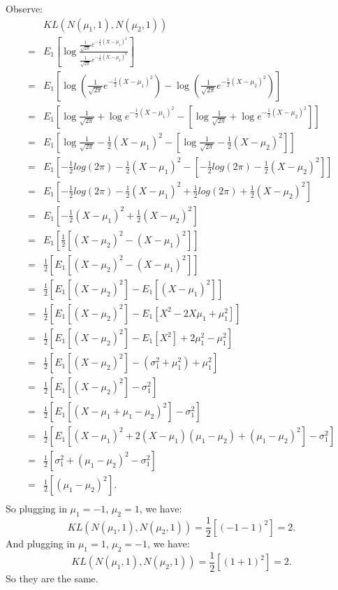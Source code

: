 \documentclass[12pt,oneside,reqno]{amsart}
\theoremstyle{plain}
\theoremstyle{definition}
\theoremstyle{remark}
\newcommand{\bb}{\vspace{3mm}}
\newcommand{\bee}{\begin{equation}\begin{aligned}}
\newcommand{\eee}{\end{aligned}\end{equation}}
\newcommand{\fracc}{\frac}
\begin{document}
\begin{enumerate}[label=\arabic*.]
\begin{enumerate}
Observe:
\bee
&KL(N(\mu_1,1),N(\mu_2,1))\\
 =& E_1\left[\log\fracc{\fracc{1}{\sqrt{2\pi}}e^{-\fracc{1}{2}(X - \mu_1)^2}}{\fracc{1}{\sqrt{2\pi}}e^{-\fracc{1}{2}(X - \mu_2)^2}} \right]\\
=& E_1\left[\log\left(\fracc{1}{\sqrt{2\pi}}e^{-\fracc{1}{2}(X - \mu_1)^2}\right) - \log\left(\fracc{1}{\sqrt{2\pi}}e^{-\fracc{1}{2}(X - \mu_2)^2}\right) \right]\\
=& E_1\left[\log\fracc{1}{\sqrt{2\pi}} + \log e^{-\fracc{1}{2}(X - \mu_1)^2} - \left[\log\fracc{1}{\sqrt{2\pi}} + \log e^{-\fracc{1}{2}(X - \mu_2)^2}\right] \right]\\
=& E_1\left[\log\fracc{1}{\sqrt{2\pi}}  -\fracc{1}{2}(X - \mu_1)^2 - \left[\log\fracc{1}{\sqrt{2\pi}}  -\fracc{1}{2}(X - \mu_2)^2\right] \right]\\
=& E_1\left[-\fracc{1}{2}log(2\pi)  -\fracc{1}{2}(X - \mu_1)^2 - \left[-\fracc{1}{2}log(2\pi)  -\fracc{1}{2}(X - \mu_2)^2\right] \right]\\
=& E_1\left[-\fracc{1}{2}log(2\pi)  -\fracc{1}{2}(X - \mu_1)^2 +\fracc{1}{2}log(2\pi)  +\fracc{1}{2}(X - \mu_2)^2 \right]\\
=& E_1\left[  -\fracc{1}{2}(X - \mu_1)^2   +\fracc{1}{2}(X - \mu_2)^2 \right]\\
=& E_1\left[  \fracc{1}{2}\left[(X - \mu_2)^2 - (X - \mu_1)^2  \right] \right]\\
=& \fracc{1}{2}\left[  E_1\left[(X - \mu_2)^2 - (X - \mu_1)^2  \right] \right]\\
=& \fracc{1}{2}\left[  E_1[(X - \mu_2)^2] - E_1[(X - \mu_1)^2]  \right]\\
=& \fracc{1}{2}\left[  E_1[(X - \mu_2)^2] - E_1[X^2 - 2X\mu_1 + \mu_1^2]  \right]\\
=& \fracc{1}{2}\left[  E_1[(X - \mu_2)^2] - E_1[X^2] + 2\mu_1^2 - \mu_1^2 \right]\\
=& \fracc{1}{2}\left[  E_1[(X - \mu_2)^2] - (\sigma_1^2 + \mu_1^2)+ \mu_1^2\right]\\
=& \fracc{1}{2}\left[  E_1[(X - \mu_2)^2] - \sigma_1^2\right]\\
=& \fracc{1}{2}\left[  E_1[(X - \mu_1 + \mu_1 - \mu_2)^2] - \sigma_1^2\right]\\
=& \fracc{1}{2}\left[  E_1[(X - \mu_1)^2 + 2(X - \mu_1)(\mu_1 - \mu_2) + (\mu_1 - \mu_2)^2] - \sigma_1^2\right]\\
=& \fracc{1}{2}\left[\sigma_1^2 + (\mu_1 - \mu_2)^2 - \sigma_1^2\right]\\
=& \fracc{1}{2}\left[(\mu_1 - \mu_2)^2 \right]. \\
\eee
So plugging in $\mu_1 = -1$, $\mu_2 = 1$, we have:
$$
KL(N(\mu_1,1),N(\mu_2,1)) = \fracc{1}{2}\left[(-1 - 1)^2 \right] = 2.
$$
And plugging in $\mu_1 = 1$, $\mu_2 = -1$, we have:
$$
KL(N(\mu_1,1),N(\mu_2,1)) = \fracc{1}{2}\left[(1 +1)^2 \right] = 2.
$$
So they are the same. 
\bb


\end{enumerate}
\end{enumerate}
\end{document}
